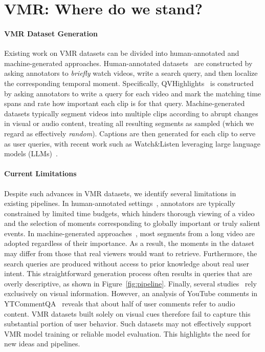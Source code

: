 \documentclass[11pt]{article}
\newcommand{\figref}[1]{Figure~\ref{#1}}
\begin{document}
\vspace{+1em}
\section{VMR: Where do we stand?}
\label{sec:section2}

\paragraph{VMR Dataset Generation}   
Existing work on VMR datasets can be divided into human-annotated and machine-generated approaches. 
Human-annotated datasets~\cite{gao2017tall, lei2020tvr, momentseeker} are constructed by asking annotators to \textit{briefly} watch videos, write a search query, and then localize the corresponding temporal moment.
Specifically, QVHighlights~\cite{QVHighlights} is constructed by asking annotators to write a query for each video and mark the matching time spans and rate how important each clip is for that query. 
Machine-generated datasets typically segment videos into multiple clips according to abrupt changes in visual or audio content, treating all resulting segments as sampled (which we regard as effectively \textit{random}). 
Captions are then generated for each clip to serve as user queries, with recent work such as Watch\&Listen leveraging large language models (LLMs)~\cite{longvale2025,watchandlisten}.

\paragraph{Current Limitations}
Despite such advances in VMR datasets, we identify several limitations in existing pipelines.
In human-annotated settings~\cite{gao2017tall, QVHighlights, momentseeker}, annotators are typically constrained by limited time budgets, which hinders thorough viewing of a video and the selection of moments corresponding to globally important or truly salient events.
In machine-generated approaches~\cite{longvale2025, watchandlisten}, most segments from a long video are adopted regardless of their importance. 
As a result, the moments in the dataset may differ from those that real viewers would want to retrieve. 
Furthermore, the search queries are produced without access to prior knowledge about real user intent. 
This straightforward generation process often results in queries that are overly descriptive, as shown in \figref{fig:pipeline}.
Finally, several studies~\cite{momentseeker} rely exclusively on visual information. However, an analysis of YouTube comments in YTCommentQA~\cite{yang2024ytcommentqa} reveals that about half of user comments refer to audio content. VMR datasets built solely on visual cues therefore fail to capture this substantial portion of user behavior.
Such datasets may not effectively support VMR model training or reliable model evaluation. 
This highlights the need for new ideas and pipelines.
\end{document}

